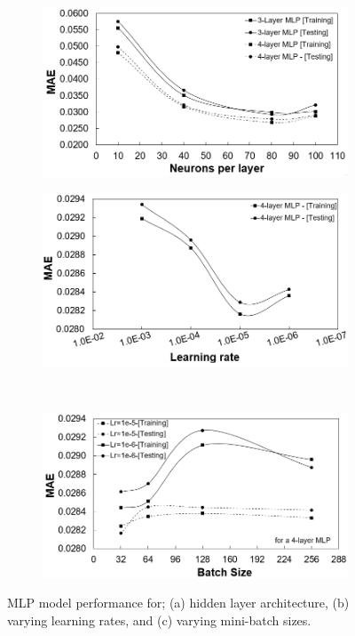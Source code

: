 \documentclass[a4paper,fleqn]{cas-sc}
\begin{document}
\begin{figure}[h!]
\centering
    \begin{subfigure}{0.48\textwidth}
    \includegraphics[width=1\textwidth]{NEURONS_HYPER}
    \caption{}
    \end{subfigure}
        \begin{subfigure}{0.48\textwidth}
    \includegraphics[width=1\textwidth]{LR_HYPER}
    \caption{}
    \end{subfigure}\\
        \begin{subfigure}{0.48\textwidth}
    \includegraphics[width=1\textwidth]{BATCH_SIZE_HYPER}
    \caption{}
    \end{subfigure}
    \caption{MLP model performance for; (a) hidden layer architecture, (b) varying learning rates, and (c) varying mini-batch sizes.}\label{fig_mlp_hyper}
\end{figure}
\end{document}
